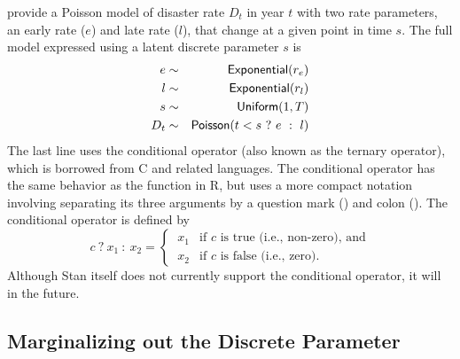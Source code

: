 \citep[Section 3.1]{PyMC:2014} provide a Poisson model of disaster
rate $D_t$ in year $t$ with two rate parameters, an early rate ($e$)
and late rate ($l$), that change at a given point in time $s$.  The
full model expressed using a latent discrete parameter $s$ is
%
\begin{eqnarray*}
e & \sim & \distro{Exponential}(r_e)
\\
l & \sim & \distro{Exponential}(r_l)
\\
s & \sim & \distro{Uniform}(1,T)
\\
D_t & \sim & \distro{Poisson}(t < s \ ? \ e \ : \ l)
\end{eqnarray*}
%
The last line uses the conditional operator (also known as the ternary
operator), which is borrowed from C and related languages.  The
conditional operator has the same behavior as the 
function in R, but uses a more compact notation involving separating
its three arguments by a question mark ()  and colon
(\code{:}).  The conditional operator is defined by
%
\[
c \ ? \ x_1 \ : \ x_2
=
\begin{cases}
\ x_1 & \mbox{if } c \mbox{ is true (i.e., non-zero), and}
\\
\ x_2 & \mbox{if } c \mbox{ is false (i.e., zero).}
\end{cases}
\]
Although Stan itself does not currently support the conditional
operator, it will in the future.


\subsection{Marginalizing out the Discrete Parameter}

